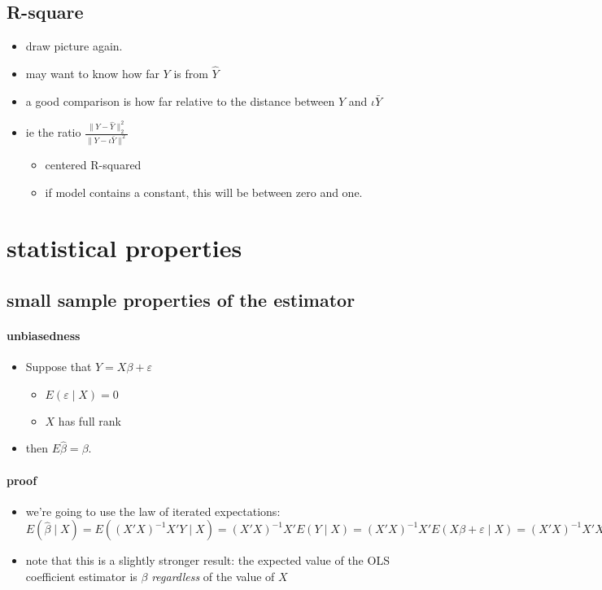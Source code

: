 \subsection{R-square}

\begin{itemize}
\item draw picture again.
\item may want to know how far $Y$ is from $\hat Y$
\item a good comparison is how far relative to the distance between $Y$
       and $\iota \bar Y$
\item ie the ratio $\frac{ \lVert Y - \hat Y \rVert_2^2}{\lVert Y - \iota
       \bar Y \rVert^2}$
\begin{itemize}
\item centered R-squared
\item if model contains a constant, this will be between zero and one.
\end{itemize}
\end{itemize}

\section{statistical properties}
\subsection{small sample properties of the estimator}

\paragraph{unbiasedness}
\begin{itemize}
\item Suppose that $Y = X\beta + \varepsilon$
\begin{itemize}
\item $E(\varepsilon \mid X) = 0$
\item $X$ has full rank
\end{itemize}
\item then $E \hat \beta = \beta$.
\end{itemize}

\paragraph{proof}
\begin{itemize}
\item we're going to use the law of iterated expectations:
         $E(\hat \beta \mid X) = E((X'X)^{-1} X'Y \mid X) = (X'X)^{-1}
           X'E(Y \mid X) = (X'X)^{-1} X'E(X\beta + \varepsilon \mid X) =
         (X'X)^{-1} X'X \beta = \beta$
\item note that this is a slightly stronger result: the expected value
         of the OLS coefficient estimator is $\beta$ \emph{regardless} of the
         value of $X$
\end{itemize}

